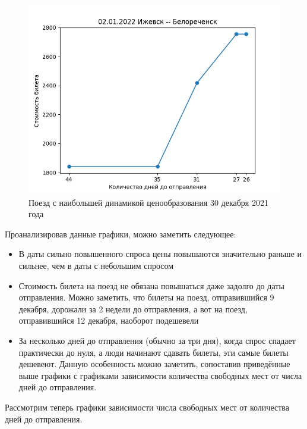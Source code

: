 \documentclass[conference]{IEEEtran}
\begin{document}
\begin{figure}
	\includegraphics[scale=0.5]{02012022}
	\caption{Поезд с наибольшей динамикой ценообразования 30 декабря 2021 года}
\end{figure}

Проанализировав данные графики, можно заметить следующее:

\begin{itemize}
	\item В даты сильно повышенного спроса цены повышаются значительно раньше и сильнее, чем в даты с небольшим спросом
	
	\item Стоимость билета на поезд не обязана повышаться даже задолго до даты отправления. Можно заметить, что билеты на поезд, отправившийся 9 декабря, дорожали за 2 недели до отправления, а вот на поезд, отправившийся 12 декабря, наоборот подешевели
	
	\item За несколько дней до отправления (обычно за три дня), когда спрос спадает практически до нуля, а люди начинают сдавать билеты, эти самые билеты дешевеют. Данную особенность можно заметить, сопоставив приведённые выше графики с графиками зависимости количества свободных мест от числа дней до отправления.
\end{itemize}

Рассмотрим теперь графики зависимости числа свободных мест от количества дней до отправления.
\end{document}
